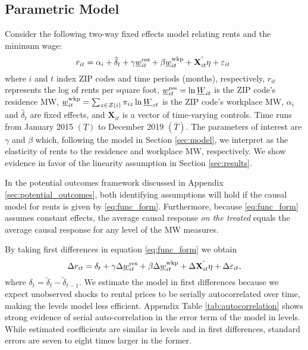 \subsection{Parametric Model}

Consider the following two-way fixed effects model relating rents and the 
minimum wage:
\begin{equation} \label{eq:func_form}
    r_{it} = \alpha_i + \tilde{\delta}_t 
           + \gamma \underline{w}^{\text{res}}_{it} + \beta \underline{w}^{\text{wkp}}_{it}
           + \mathbf{X}^{'}_{it}\eta
           + \varepsilon_{it} \ 
\end{equation}    
where
$i$ and $t$ index ZIP codes and time periods (months), respectively,
$r_{it}$ represents the log of rents per square foot,
$\underline{w}^{\text{res}}_{it} = \ln \underline{W}_{it}$ is the ZIP code's residence MW,
$\underline{w}^{\text{wkp}}_{it} = \sum_{z\in\mathcal{Z}(i)} \pi_{iz}\ln \underline{W}_{zt}$ is the ZIP code's 
workplace MW,
$\alpha_i$ and $\hat{\delta}_t$ are fixed effects, and 
$\mathbf{X}_{it}$ is a vector of time-varying controls.
Time runs from January 2015 $\left(\underline{T}\right)$ 
to December 2019 $\left(\overline{T}\right)$.
The parameters of interest are $\gamma$ and $\beta$ which, 
following the model in Section \ref{sec:model}, 
we interpret as the elasticity of rents to the residence and workplace MW, 
respectively.
We show evidence in favor of the linearity assumption in Section \ref{sec:results}.

In the potential outcomes framework discussed in Appendix 
\ref{sec:potential_outcomes}, both identifying assumptions will hold if
the causal model for rents is given by \eqref{eq:func_form}.
Furthermore, because \eqref{eq:func_form} assumes constant effects, the 
average causal response \textit{on the treated} equals the average causal 
response for any level of the MW measures.

By taking first differences in equation \eqref{eq:func_form} we obtain
\begin{equation}\label{eq:fd}
    \Delta r_{it} = \delta_t
                  + \gamma \Delta \underline{w}^{\text{res}}_{it} + \beta \Delta \underline{w}^{\text{wkp}}_{it}
                  + \Delta \mathbf{X}^{'}_{it}\eta
                  + \Delta \varepsilon_{it} ,
\end{equation}
where $\delta_t = \tilde{\delta}_t - \tilde{\delta}_{t-1}$.
We estimate the model in first differences because we expect unobserved shocks
to rental prices to be serially autocorrelated over time, making the levels
model less efficient.
Appendix Table \ref{tab:autocorrelation} shows strong evidence of serial 
auto-correlation in the error term of the model in levels.
While estimated coefficients are similar in levels and in first differences, 
standard errors are seven to eight times larger in the former.

